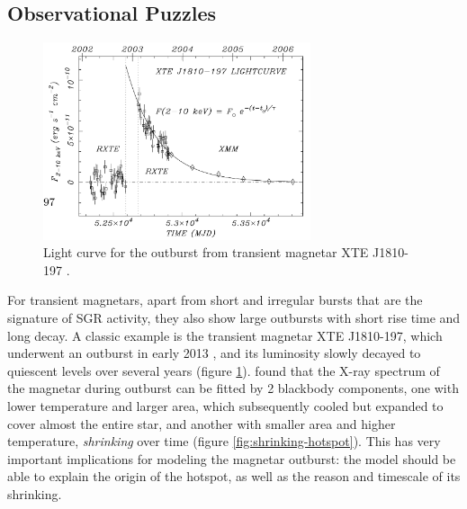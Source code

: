 \subsection{Observational Puzzles}
\label{sec:magnetar-puzzles}

\begin{figure}[h]
  \centering
  \includegraphics[width=0.7\textwidth]{pics/intro/transient.png}
  \caption[Light curve for the outburst from transient magnetar XTE J1810-197]{Light curve for the outburst from transient magnetar XTE J1810-197 \citep{gotthelf_anatomy_2007}.}
  \label{fig:outburst-light-curve}
\end{figure}

For transient magnetars, apart from short and irregular bursts that are the
signature of SGR activity, they also show large outbursts with short rise time
and long decay. A classic example is the transient magnetar XTE J1810-197, which
underwent an outburst in early 2013 \citep{ibrahim_discovery_2004}, and its
luminosity slowly decayed to quiescent levels over several years (figure
\ref{fig:outburst-light-curve}). \citet{gotthelf_anatomy_2007} found that the
X-ray spectrum of the magnetar during outburst can be fitted by 2 blackbody
components, one with lower temperature and larger area, which subsequently cooled
but expanded to cover almost the entire star, and another with smaller area and
higher temperature, {\it shrinking} over time (figure
\ref{fig:shrinking-hotspot}). This has very important implications for modeling
the magnetar outburst: the model should be able to explain the origin of the
hotspot, as well as the reason and timescale of its shrinking.

